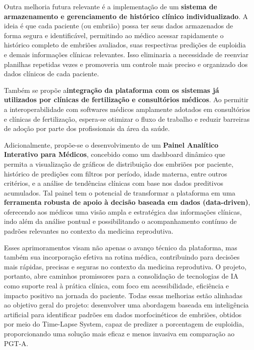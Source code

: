 Outra melhoria futura relevante é a implementação de um \textbf{sistema de armazenamento e gerenciamento de histórico clínico individualizado}. A ideia é que cada paciente (ou embrião) possa ter seus dados armazenados de forma segura e identificável, permitindo ao médico acessar rapidamente o histórico completo de embriões avaliados, suas respectivas predições de euploidia e demais informações clínicas relevantes. Isso eliminaria a necessidade de reenviar planilhas repetidas vezes e promoveria um controle mais preciso e organizado dos dados clínicos de cada paciente.

Também se propõe a\textbf{integração da plataforma com os sistemas já utilizados por clínicas de fertilização e consultórios médicos}. Ao permitir a interoperabilidade com softwares médicos amplamente adotados em consultórios e clínicas de fertilização, espera-se otimizar o fluxo de trabalho e reduzir barreiras de adoção por parte dos profissionais da área da saúde.

Adicionalmente, propõe-se o desenvolvimento de um \textbf{Painel Analítico Interativo para Médicos}, concebido como um dashboard dinâmico que permita a visualização de gráficos de distribuição dos embriões por paciente, histórico de predições com filtros por período, idade materna, entre outros critérios, e a análise de tendências clínicas com base nos dados preditivos acumulados. Tal painel tem o potencial de transformar a plataforma em uma \textbf{ferramenta robusta de apoio à decisão baseada em dados (data-driven)}, oferecendo aos médicos uma visão ampla e estratégica das informações clínicas, indo além da análise pontual e possibilitando o acompanhamento contínuo de padrões relevantes no contexto da medicina reprodutiva.

Esses aprimoramentos visam não apenas o avanço técnico da plataforma, mas também sua incorporação efetiva na rotina médica, contribuindo para decisões mais rápidas, precisas e seguras no contexto da medicina reprodutiva. O projeto, portanto, abre caminhos promissores para a consolidação de tecnologias de IA como suporte real à prática clínica, com foco em acessibilidade, eficiência e impacto positivo na jornada do paciente. Todas essas melhorias estão alinhadas ao objetivo geral do projeto: desenvolver uma abordagem baseada em inteligência artificial para identificar padrões em dados morfocinéticos de embriões, obtidos por meio do Time-Lapse System, capaz de predizer a porcentagem de euploidia, proporcionando uma solução mais eficaz e menos invasiva em comparação ao PGT-A.